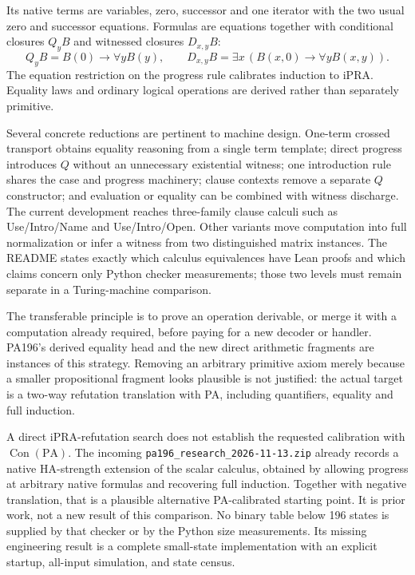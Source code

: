 Its native terms are variables, zero, successor and one iterator with the
two usual zero and successor equations.  Formulas are equations together
with conditional closures $Q_yB$ and witnessed closures $D_{x,y}B$:
\[
 Q_yB=B(0)\to\forall y B(y),\qquad
 D_{x,y}B=\exists x\,(B(x,0)\to\forall y B(x,y)).
\]
The equation restriction on the progress rule calibrates induction to
iPRA.  Equality laws and ordinary logical operations are derived rather
than separately primitive.

Several concrete reductions are pertinent to machine design.  One-term
crossed transport obtains equality reasoning from a single term template;
direct progress introduces $Q$ without an unnecessary existential witness;
one introduction rule shares the case and progress machinery; clause
contexts remove a separate $Q$ constructor; and evaluation or equality can
be combined with witness discharge.  The current development reaches
three-family clause calculi such as Use/Intro/Name and Use/Intro/Open.
Other variants move computation into full normalization or infer a witness
from two distinguished matrix instances.  The README states exactly which
calculus equivalences have Lean proofs and which claims concern only
Python checker measurements; those two levels must remain separate in a
Turing-machine comparison.

The transferable principle is to prove an operation derivable, or merge it
with a computation already required, before paying for a new decoder or
handler.  PA196's derived equality head and the new direct arithmetic
fragments are instances of this strategy.  Removing an arbitrary primitive
axiom merely because a smaller propositional fragment looks plausible is
not justified: the actual target is a two-way refutation translation with
PA, including quantifiers, equality and full induction.

A direct iPRA-refutation search does not establish the requested
calibration with $\operatorname{Con}(\mathrm{PA})$.  The incoming
\texttt{pa196\_research\_2026-11-13.zip} already records a native
HA-strength extension of the scalar calculus, obtained by allowing progress
at arbitrary native formulas and recovering full induction.  Together
with negative translation, that is a plausible alternative PA-calibrated
starting point.  It is prior work, not a new result of this comparison.
No binary table below 196 states is supplied by that checker or by the
Python size measurements.  Its missing engineering result is a complete
small-state implementation with an explicit startup, all-input simulation,
and state census.
